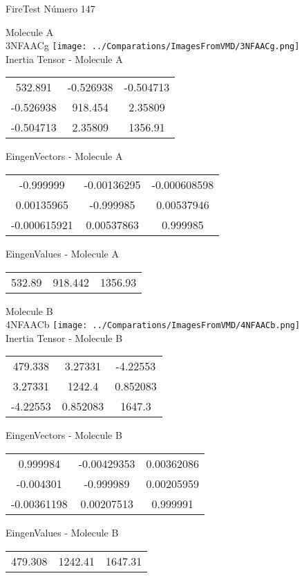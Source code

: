 \vtab[-2cm]
\begin{center}
{\large FireTest \tab Número 147}
\end{center}
\begin{multicols}{2}
\begin{center}

Molecule A \\ 
3NFAACg
\texttt{[image: ../Comparations/ImagesFromVMD/3NFAACg.png]}
\\
Inertia Tensor - Molecule A \\
\vtab

\begin{tabular}{|c c c|}
532.891	 & 	-0.526938	 & 	-0.504713	 \\
-0.526938	 & 	918.454	 & 	2.35809	 \\
-0.504713	 & 	2.35809	 & 	1356.91
\end{tabular}

\vtab
 EingenVectors - Molecule A     \\
\vtab
\begin{tabular}{|c c c|}
-0.999999	 & 	-0.00136295	 & 	-0.000608598	 \\
0.00135965	 & 	-0.999985	 & 	0.00537946	 \\
-0.000615921	 & 	0.00537863	 & 	0.999985
\end{tabular}

\vtab
 EingenValues - Molecule A     \\
\vtab
\begin{tabular}{|c c c|}
532.89	 & 	918.442	 & 	1356.93	 \\
\end{tabular}
\columnbreak

Molecule B \\ 
4NFAACb
\texttt{[image: ../Comparations/ImagesFromVMD/4NFAACb.png]}
\\
Inertia Tensor - Molecule B \\
\vtab

\begin{tabular}{|c c c|}
479.338	 & 	3.27331	 & 	-4.22553	 \\
3.27331	 & 	1242.4	 & 	0.852083	 \\
-4.22553	 & 	0.852083	 & 	1647.3
\end{tabular}

\vtab
 EingenVectors - Molecule B     \\
\vtab
\begin{tabular}{|c c c|}
0.999984	 & 	-0.00429353	 & 	0.00362086	 \\
-0.004301	 & 	-0.999989	 & 	0.00205959	 \\
-0.00361198	 & 	0.00207513	 & 	0.999991
\end{tabular}

\vtab
 EingenValues - Molecule B     \\
\vtab
\begin{tabular}{|c c c|}
479.308	 & 	1242.41	 & 	1647.31	 \\
\end{tabular}

\end{center}
\end{multicols}
